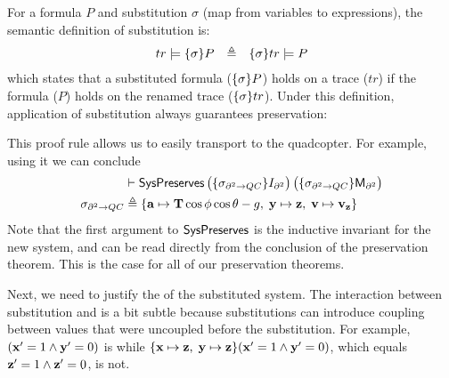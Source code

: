For a formula $P$ and substitution $\sigma$ (map from variables to
expressions), the semantic definition of substitution is:
\[\begin{array}{rcl}
tr \models \Rename{\sigma}{P} & \triangleq & \Rename{\sigma}{tr} \models P
\end{array}
\]
which states that a substituted formula ($\Rename{\sigma}{P}$) holds on a
trace ($tr$) if the formula ($P$) holds on the renamed trace
($\Rename{\sigma}{tr}$).  Under this definition, application of
substitution always guarantees preservation:
\begin{theorem}{}
\begin{prooftree}
\end{prooftree}
\end{theorem}
This proof rule allows us to easily
transport  to the quadcopter.  For
example, using it we can conclude
\begin{align*}
&\entails \SysPreservesP{\big(\Rename{\sigma_{\partial^2\rightarrow{}QC}}{\invShimx}\big)}{\big(\Rename{\sigma_{\partial^2\rightarrow{}QC}}{\derivShimx}\big)} \\
\sigma_{\partial^2\rightarrow{}QC} &\defined \{\tlavar{a} \mapsto \tlavar{T} \cos \tlavar{\roll} \cos \tlavar{\pitch} - g ,\; \tlavar{y} \mapsto \tlavar{z} ,\; \tlavar{v} \mapsto \tlavar{v_z}\}
\end{align*}
Note that the first argument to $\SysPreserves{}$ is the inductive
invariant for the new system, and can be read directly from the conclusion
of the preservation theorem.  This is the case for all of our preservation
theorems.

Next, we need to justify the \progress{} of the substituted system.  The
interaction between substitution and \progress{} is a bit subtle because
substitutions can introduce coupling between values that were uncoupled
before the substitution.  For example, $(\tlanextvar{x} =
1 \wedge \tlanextvar{y} = 0)$ is \Enabled{} while
$\Rename{\tlavar{x} \mapsto \tlavar{z}
,\; \tlavar{y} \mapsto \tlavar{z}}{(\tlanextvar{x} =
1 \wedge \tlanextvar{y} = 0)}$, which equals $\tlanextvar{z} =
1 \wedge \tlanextvar{z} = 0$, is not.

